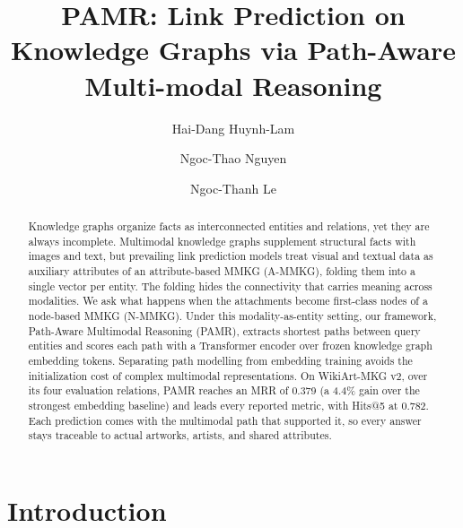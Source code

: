 \documentclass[runningheads]{llncs}
\begin{document}
%
\title{PAMR: Link Prediction on Knowledge Graphs via Path-Aware Multi-modal Reasoning}
%

\author{Hai-Dang Huynh-Lam \and
  Ngoc-Thao Nguyen \and
Ngoc-Thanh Le}
%
%
\maketitle  %
%
\begin{abstract}
  Knowledge graphs organize facts as interconnected entities and relations, yet
  they are always incomplete. Multimodal knowledge graphs supplement structural
  facts with images and text, but prevailing link prediction models treat visual
  and textual data as auxiliary attributes of an attribute-based MMKG (A-MMKG),
  folding them into a single vector per entity. The folding hides the
  connectivity that carries meaning across modalities. We ask what happens when
  the attachments become first-class nodes of a node-based MMKG (N-MMKG). Under
  this modality-as-entity setting, our framework, Path-Aware Multimodal
  Reasoning (PAMR), extracts shortest paths between query entities and scores
  each path with a Transformer encoder over frozen knowledge graph embedding
  tokens. Separating path modelling from embedding training avoids the
  initialization cost of complex multimodal representations. On WikiArt-MKG v2,
  over its four evaluation relations, PAMR
  reaches an MRR of 0.379 (a 4.4\% gain over the strongest embedding baseline)
  and leads every reported metric, with Hits@5 at 0.782. Each prediction comes with the multimodal path
  that supported it, so every answer stays traceable to actual artworks,
  artists, and shared attributes.

\end{abstract}
%
%
%

\section{Introduction}
\label{sec:introduction}
\end{document}
